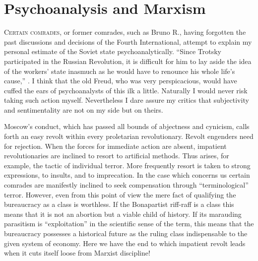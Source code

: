 
\section*{Psychoanalysis and Marxism}

\textsc{Certain comrades}, or former comrades, such as Bruno R., having forgotten the past discussions and decisions of the Fourth International, attempt to explain my personal estimate of the Soviet state psychoanalytically. “Since Trotsky participated in the Russian Revolution, it is difficult for him to lay aside the idea of the workers’ state inasmuch as he would have to renounce his whole life’s cause,” \etc. I think that the old Freud, who was very perspicacious, would have cuffed the ears of psychoanalysts of this ilk a little. Naturally I would never risk taking such action myself. Nevertheless I dare assure my critics that subjectivity and sentimentality are not on my side but on theirs.

Moscow’s conduct, which has passed all bounds of abjectness and cynicism, calls forth an easy revolt within every proletarian revolutionary. Revolt engenders need for rejection. When the forces for immediate action are absent, impatient revolutionaries are inclined to resort to artificial methods. Thus arises, for example, the tactic of individual terror. More frequently resort is taken to strong expressions, to insults, and to imprecation. In the case which concerns us certain comrades are manifestly inclined to seek compensation through “terminological” terror. However, even from this point of view the mere fact of qualifying the bureaucracy as a class is worthless. If the Bonapartist riff-raff is a class this means that it is not an abortion but a viable child of history. If its marauding parasitism is “exploitation” in the scientific sense of the term, this means that the bureaucracy possesses a historical future as the ruling class indispensable to the given system of economy. Here we have the end to which impatient revolt leads when it cuts itself loose from Marxist discipline!

